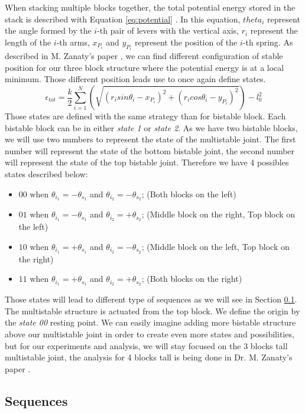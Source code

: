         When stacking multiple blocks together, the total potential energy stored in the stack is described with Equation \ref{eq:potential}  \cite{mo_main_paper}. In this equation, $theta_i$ represent the angle formed by the $i$-th pair of levers with the vertical axis, $r_i$ represent the length of the $i$-th arms, $x_{P_i}$ and $y_{P_i}$ represent the position of the $i$-th spring. As described in M. Zanaty's paper \cite{mo_main_paper}, we can find different configuration of stable position for our three block structure where the potential energy is at a local minimum. Those different position leads use to once again define states. 
        \begin{equation}
            \epsilon_{tot} = \frac{k}{2} \sum_{i=1}^{N}\left(\sqrt{(r_i sin \theta_i - x_{P_i})^2 + (r_i cos \theta_i - y_{P_i})^2} \right) - l_0^2
            \label{eq:potential}
        \end{equation}
        Those states are defined with the same strategy than for bistable block. Each bistable block can be in either \textit{state 1} or \textit{state 2}. As we have two bistable blocks, we will use two numbers to represent the state of the multistable joint. The first number will represent the state of the bottom bistable joint, the second number will represent the state of the top bistable joint. Therefore we have 4 possibles states described below: \\
        \begin{itemize}
            \item $00$ when $\theta_{i_1} = -\theta_{s_1}$ and $\theta_{i_2} = -\theta_{s_2}$; (Both blocks on the left)
            \item $01$ when $\theta_{i_1} = -\theta_{s_1}$ and $\theta_{i_2} = +\theta_{s_2}$; (Middle block on the right, Top block on the left)
            \item $10$ when $\theta_{i_1} = +\theta_{s_1}$ and $\theta_{i_2} = -\theta_{s_2}$; (Middle block on the left, Top block on the right)
            \item $11$ when $\theta_{i_1} = +\theta_{s_1}$ and $\theta_{i_2} = +\theta_{s_2}$; (Both blocks on the right)
        \end{itemize}
        
        Those states will lead to different type of sequences as we will see in Section \ref{sec:sequences}. The multistable structure is actuated from the top block. We define the origin by the \textit{state 00} resting point. We can easily imagine adding more bistable structure above our multistable joint in order to create even more states and possibilities, but for our experiments and analysis, we will stay focused on the 3 blocks tall multistable joint, the analysis for 4 blocks tall is being done in Dr. M. Zanaty's paper \cite{mo_main_paper}.
        
    \subsection{Sequences}\label{sec:sequences}
    
    
